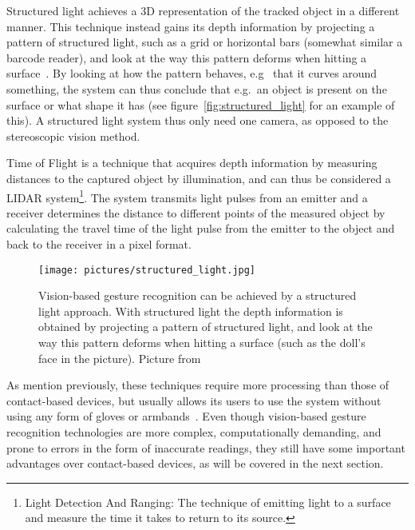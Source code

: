 Structured light achieves a 3D representation of the tracked object in a different manner. This technique instead gains its depth information by projecting a pattern 
of structured light, such as a grid or horizontal bars (somewhat similar a barcode reader), and look at the way this pattern deforms when hitting a surface~\citep{Ko2012}.
By looking at how the pattern behaves, e.g~ that it curves around something, the system can thus conclude that e.g.~an object is present on the surface or what shape it has 
(see figure~\vref{fig:structured_light} for an example of this). 
A structured light system thus only need one camera, as opposed to the stereoscopic vision method. 

Time of Flight is a technique that acquires depth information by measuring distances to the captured object by illumination, and 
can thus be considered a LIDAR system\footnote{Light Detection And Ranging: The technique of emitting light to a surface and measure the time it takes to return to its source.}. 
The system transmits light pulses from an emitter and a receiver determines the distance to different points of the measured object 
by calculating the travel time of the light pulse from the emitter to the object and back to the receiver in a pixel format.

\begin{figure}%
	\texttt{[image: pictures/structured\_light.jpg]}
	\caption[Vision-based recognition by structured light.]{Vision-based gesture recognition can be achieved by a structured light approach.
		With structured light the depth information is obtained by projecting a pattern of structured light, 
		and look at the way this pattern deforms when hitting a surface (such as the doll's face in the picture). Picture from~\citet{Ramamoorthi2007}}
	\label{fig:structured_light}
\end{figure} 

As mention previously, these techniques require more processing than those of contact-based devices, but usually allows its users to use the system
without using any form of gloves or armbands~\citep{Rautaray2015}. 
Even though vision-based gesture recognition technologies are more complex, computationally demanding, and prone to 
errors in the form of inaccurate readings, they still have some important advantages over contact-based devices, as will be covered in the next section.


